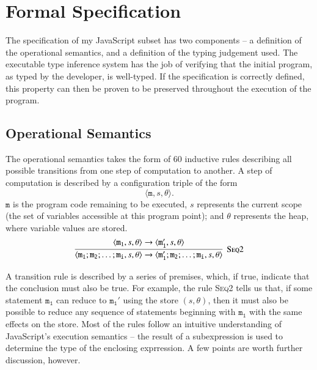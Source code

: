 \documentclass[12pt,a4paper,twoside,openright]{report}
\theoremstyle{definition}
\theoremstyle{dotless}
\begin{document}
\section{Formal Specification}

The specification of my JavaScript subset has two components -- a definition of
the operational semantics, and a definition of the typing judgement used. The
executable type inference system has the job of verifying that the initial
program, as typed by the developer, is well-typed. If the specification is
correctly defined, this property can then be proven to be preserved throughout the
execution of the program.

\subsection{Operational Semantics}
The operational semantics takes the form of {\color{red}60} inductive rules
describing all possible transitions from one step of computation to another. A
step of computation is described by a configuration triple of the form
$$\langle \mathtt{m}, s, \theta\rangle.$$ $\mathtt{m}$ is the program code remaining to be
executed, $s$ represents the current scope (the set of variables accessible at
this program point); and $\theta$ represents the heap, where variable values
are stored.
$$\infer[\textsc{Seq2}]
{\langle \mathtt{m_1; m_2; \dots; m_i}, s, \theta\rangle \rightarrow \langle \mathtt{m_1'; m_2; \dots; m_i}, s, \theta\rangle}
{\langle\mathtt{m_1}, s, \theta\rangle\rightarrow\langle \mathtt{m_1'},s, \theta\rangle}$$

A transition rule is described by a series of premises, which, if true,
indicate that the conclusion must also be true. For example, the rule
\textsc{Seq2} tells us that, if some statement $\mathtt{m_1}$ can reduce to $\mathtt{m_1'}$ using
the store $(s,\theta)$, then it must also be possible to reduce any sequence of
statements beginning with $\mathtt{m_1}$ with the same effects on the store. Most of the
rules follow an intuitive understanding of JavaScript's execution semantics --
the result of a subexpression is used to determine the type of the enclosing exprression. A
few points are worth further discussion, however.

%
\end{document}
